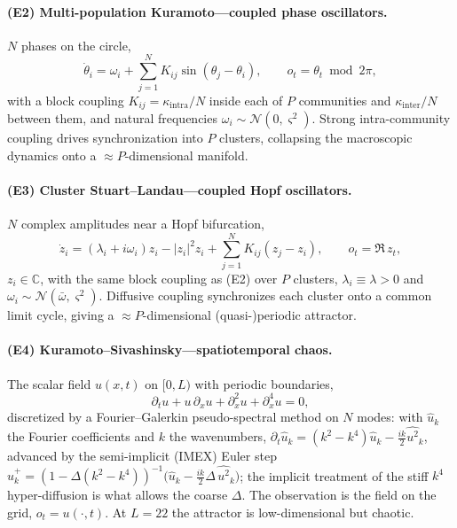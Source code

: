 \documentclass[10pt]{article}
\theoremstyle{plain}
\theoremstyle{definition}
\theoremstyle{remark}
\newcommand{\abs}[1]{\left\lvert #1 \right\rvert}
\begin{document}
\paragraph{(E2) Multi-population Kuramoto---coupled phase oscillators.}
$N$ phases on the circle,
\begin{equation}
 \dot\theta_i=\omega_i+\sum_{j=1}^N K_{ij}\sin(\theta_j-\theta_i),\qquad
 o_t=\theta_t\bmod 2\pi,
 \label{eq:kur}
\end{equation}
with a block coupling $K_{ij}=\kappa_{\mathrm{intra}}/N$ inside each of $P$
communities and $\kappa_{\mathrm{inter}}/N$ between them, and natural frequencies
$\omega_i\sim\mathcal N(0,\varsigma^2)$. Strong intra-community coupling drives
synchronization into $P$ clusters, collapsing the macroscopic dynamics onto a
$\approx P$-dimensional manifold.

\paragraph{(E3) Cluster Stuart--Landau---coupled Hopf oscillators.}
$N$ complex amplitudes near a Hopf bifurcation,
\begin{equation}
 \dot z_i=(\lambda_i+i\omega_i)z_i-\abs{z_i}^2 z_i
   +\sum_{j=1}^N K_{ij}(z_j-z_i),\qquad o_t=\Re\,z_t,
 \label{eq:sl}
\end{equation}
$z_i\in\mathbb C$, with the same block coupling as (E2) over $P$ clusters,
$\lambda_i\equiv\lambda>0$ and $\omega_i\sim\mathcal N(\bar\omega,\varsigma^2)$.
Diffusive coupling synchronizes each cluster onto a common limit cycle, giving a
$\approx P$-dimensional (quasi-)periodic attractor.

\paragraph{(E4) Kuramoto--Sivashinsky---spatiotemporal chaos.}
The scalar field $u(x,t)$ on $[0,L)$ with periodic boundaries,
\begin{equation}
 \partial_t u+u\,\partial_x u+\partial_x^2 u+\partial_x^4 u=0 ,
 \label{eq:ks}
\end{equation}
discretized by a Fourier--Galerkin pseudo-spectral method on $N$ modes: with
$\hat u_k$ the Fourier coefficients and $k$ the wavenumbers,
$\partial_t\hat u_k=(k^2-k^4)\hat u_k-\tfrac{i k}{2}\widehat{u^2}_k$, advanced by
the semi-implicit (IMEX) Euler step
$\hat u_k^{+}=(1-\Delta(k^2-k^4))^{-1}\!\big(\hat u_k-\tfrac{i k}{2}\Delta\,
\widehat{u^2}_k\big)$; the implicit treatment of the stiff $k^4$
hyper-diffusion is what allows the coarse $\Delta$. The observation is the field
on the grid, $o_t=u(\cdot,t)$. At $L=22$ the attractor is low-dimensional but
chaotic.
\end{document}
